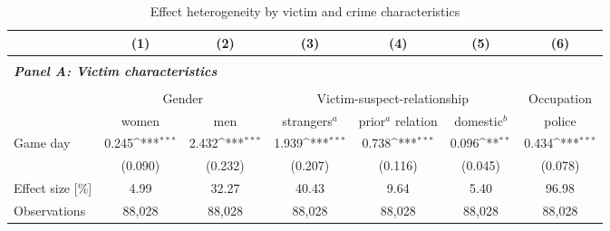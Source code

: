 

\begin{table}[t] \centering 
	\begin{threeparttable} \centering \caption{Effect heterogeneity by victim and crime characteristics}
		\label{tab_soc_ext:reg_fe_assrate_victim_crime_chars}
		{\def\sym#1{\ifmmode^{#1}\else\(^{#1}\)\fi} 
			\begin{tabular}{l*{6}{c}}
				\toprule 
				&\multicolumn{1}{c}{(1)}&\multicolumn{1}{c}{(2)}&\multicolumn{1}{c}{(3)}&\multicolumn{1}{c}{(4)}&\multicolumn{1}{c}{(5)}&\multicolumn{1}{c}{(6)}\\
				\midrule

				\\
				\multicolumn{6}{l}{\textit{\textbf{Panel A: Victim characteristics}}} \\\\
					& \multicolumn{2}{c}{Gender} & \multicolumn{3}{c}{Victim-suspect-relationship} & Occupation \\
					\cmidrule(lr){2-3} \cmidrule(lr){4-6} \cmidrule(lr){7-7}
				&  women & men & strangers$^a$ & \clb{c}{prior$^a$\\relation} & domestic$^b$ & police \\
				\midrule			
				Game day           		 &     0.245\sym{***}&       2.432\sym{***}&       1.939\sym{***}&       0.738\sym{***}&       0.096\sym{**} &       0.434\sym{***}\\
				                    	 &   (0.090)         &     (0.232)         &     (0.207)         &     (0.116)         &     (0.045)         &     (0.078)         \\
				Effect size [\%]&      4.99         &       32.27         &       40.43         &        9.64         &        5.40         &       96.98         \\
				Observations        	 &    88,028         &      88,028         &      88,028         &      88,028         &      88,028         &      88,028         \\
				

\end{tabular}}
\end{threeparttable}
\end{table}
